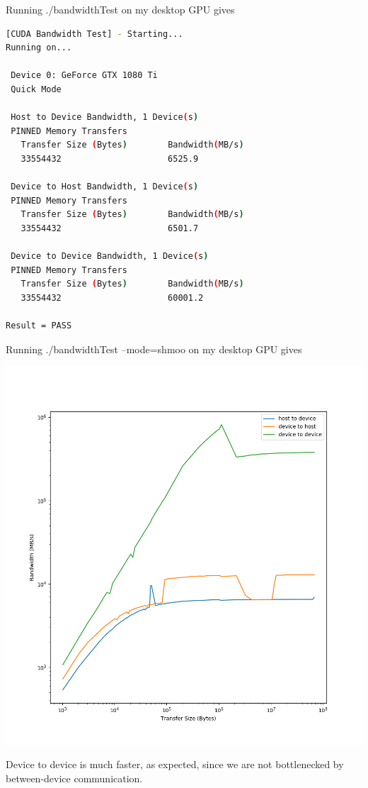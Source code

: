 \documentclass{article}
\begin{document}
Running ./bandwidthTest on my desktop GPU gives

\begin{lstlisting}[language=bash]
[CUDA Bandwidth Test] - Starting...
Running on...

 Device 0: GeForce GTX 1080 Ti
 Quick Mode

 Host to Device Bandwidth, 1 Device(s)
 PINNED Memory Transfers
   Transfer Size (Bytes)        Bandwidth(MB/s)
   33554432                     6525.9

 Device to Host Bandwidth, 1 Device(s)
 PINNED Memory Transfers
   Transfer Size (Bytes)        Bandwidth(MB/s)
   33554432                     6501.7

 Device to Device Bandwidth, 1 Device(s)
 PINNED Memory Transfers
   Transfer Size (Bytes)        Bandwidth(MB/s)
   33554432                     60001.2

Result = PASS

\end{lstlisting}

Running ./bandwidthTest --mode=shmoo on my desktop GPU gives

\includegraphics[scale=0.5]{devices.png}

Device to device is much faster, as expected, since we are not bottlenecked by between-device communication.
\end{document}
